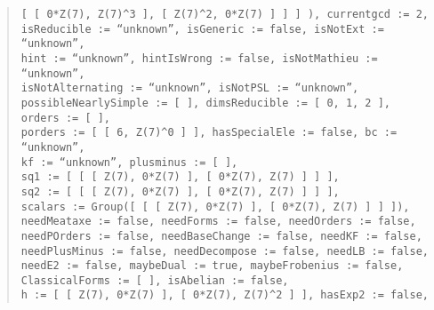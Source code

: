 \documentclass[a4paper,11pt]{article}
\theoremstyle{bla}
\begin{document}
\begin{quote}
          \hspace*{-1cm} \texttt{[ [ 0*Z(7), Z(7)\^{}3 ], [ Z(7)\^{}2, 0*Z(7) ] ] ] ), currentgcd := 2,}\\
  \hspace*{-1cm} \texttt{isReducible := ``unknown'', isGeneric := false, isNotExt := ``unknown'',}\\
  \hspace*{-1cm} \texttt{hint := ``unknown'', hintIsWrong := false, isNotMathieu := ``unknown'',}\\
  \hspace*{-1cm} \texttt{isNotAlternating := ``unknown'', isNotPSL := ``unknown'',}\\
  \hspace*{-1cm} \texttt{possibleNearlySimple := [  ], dimsReducible := [ 0, 1, 2 ], orders := [  ],}\\
  \hspace*{-1cm} \texttt{porders := [ [ 6, Z(7)\^{}0 ] ], hasSpecialEle := false, bc := ``unknown'',}\\
  \hspace*{-1cm} \texttt{kf := ``unknown'', plusminus := [  ],}\\
  \hspace*{-1cm} \texttt{sq1 := [ [ [ Z(7), 0*Z(7) ], [ 0*Z(7), Z(7) ] ] ],}\\
  \hspace*{-1cm} \texttt{sq2 := [ [ [ Z(7), 0*Z(7) ], [ 0*Z(7), Z(7) ] ] ],}\\
  \hspace*{-1cm} \texttt{scalars := Group([ [ [ Z(7), 0*Z(7) ], [ 0*Z(7), Z(7) ] ] ]),}\\
  \hspace*{-1cm} \texttt{needMeataxe := false, needForms := false, needOrders := false,}\\
  \hspace*{-1cm} \texttt{needPOrders := false, needBaseChange := false, needKF := false,}\\
  \hspace*{-1cm} \texttt{needPlusMinus := false, needDecompose := false, needLB := false,}\\
  \hspace*{-1cm} \texttt{needE2 := false, maybeDual := true, maybeFrobenius := false,}\\
  \hspace*{-1cm} \texttt{ClassicalForms := [  ], isAbelian := false,}\\
  \hspace*{-1cm} \texttt{h := [ [ Z(7), 0*Z(7) ], [ 0*Z(7), Z(7)\^{}2 ] ], hasExp2 := false,}\\

\end{quote}
\end{document}
